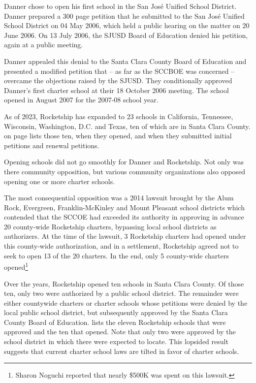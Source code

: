 Danner chose to open his first school in the San José Unified School District. Danner prepared a 300 page petition that he submitted to the San José Unified School District on 04 May 2006, which held a public hearing on the matter on 20 June 2006. On 13 July 2006, the SJUSD Board of Education denied his petition, again at a public meeting.

Danner appealed this denial to the Santa Clara County Board of Education and presented a modified petition that – as far as the SCCBOE was concerned – overcame the objections raised by the SJUSD. They conditionally approved Danner's first charter school at their 18 October 2006 meeting. The school opened in August 2007 for the 2007-08 school year.

As of 2023, Rocketship has expanded to 23 schools in California, Tennessee, Wisconsin, Washington, D.C. and Texas, ten of which are in Santa Clara County.  on page \pageref{tab:RocketshipSchools} lists those ten, when they opened, and when they submitted initial petitions and renewal petitions.

Opening schools did not go smoothly for Danner and Rocketship. Not only was there community opposition, but various community organizations also opposed opening one or more charter schools.

The most consequential opposition was a 2014 lawsuit brought by the Alum Rock, Evergreen, Franklin-McKinley and Mount Pleasant school districts which contended that the SCCOE had exceeded its authority in approving in advance 20 county-wide Rocketship charters, bypassing local school districts as authorizers. At the time of the lawsuit, 3 Rocketship charters had opened under this county-wide authorization, and in a settlement, Rocketship agreed not to seek to open 13 of the 20 charters. In the end, only 5 county-wide charters opened\footnote{Sharon Noguchi reported that nearly \$500K was spent on this lawsuit\parencite{Noguchi2015}.}

Over the years, Rocketship opened ten schools in Santa Clara County. Of those ten, only two were authorized by a public school district. The remainder were either countywide charters or charter schools whose petitions were denied by the local public school district, but subsequently approved by the Santa Clara County Board of Education.  lists the eleven Rocketship schools that were approved and the ten that opened. Note that only two were approved by the school district in which there were expected to locate. This lopsided result suggests that current charter school laws are tilted in favor of charter schools. 

